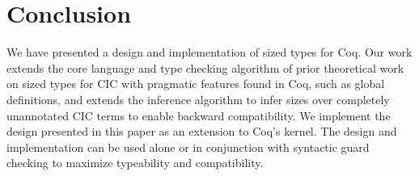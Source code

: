 \section{Conclusion}
\label{sec:conclusion}
We have presented a design and implementation of sized types for Coq.
Our work extends the core language and type checking algorithm of prior theoretical work on sized types for CIC with pragmatic features found in Coq, such as global definitions, and extends the inference algorithm to infer sizes over completely unannotated CIC terms to enable backward compatibility.
We implement the design presented in this paper as an extension to Coq's kernel\blindimpl.
The design and implementation can be used alone or in conjunction with syntactic guard checking to maximize typeability and compatibility.

